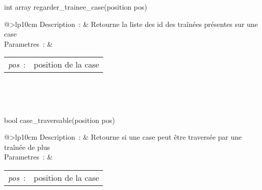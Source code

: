 \begin{minipage}{\linewidth}

\begin{lst-c++}
int array regarder_trainee_case(position pos)
\end{lst-c++}

\noindent
\begin{tabular}[t]{@{\extracolsep{0pt}}>{\bfseries}lp{10cm}}
Description~: & Retourne la liste des id des traînées présentes sur une case \\


Parametres~: &
\begin{tabular}[t]{@{\extracolsep{0pt}}ll}
    
    
      
        \textsl{pos}~: & position de la case \\
      
    
  \end{tabular} \\






\end{tabular} \\[0.3cm]
\end{minipage}


\begin{minipage}{\linewidth}

\begin{lst-c++}
bool case_traversable(position pos)
\end{lst-c++}

\noindent
\begin{tabular}[t]{@{\extracolsep{0pt}}>{\bfseries}lp{10cm}}
Description~: & Retourne si une case peut être traversée par une traînée de plus \\


Parametres~: &
\begin{tabular}[t]{@{\extracolsep{0pt}}ll}
    
    
      
        \textsl{pos}~: & position de la case \\
      
    
  \end{tabular} \\






\end{tabular} \\[0.3cm]
\end{minipage}


